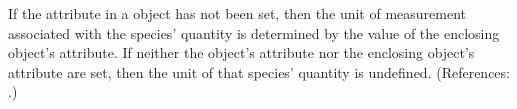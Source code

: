If the attribute  in a \Species object has not been
set, then the unit of measurement associated with the species' quantity is
determined by the value of the enclosing \Model object's
 attribute.  If neither the \Species object's
 attribute nor the enclosing \Model object's
 attribute are set, then the unit of that species'
quantity is undefined.  (References: .)
